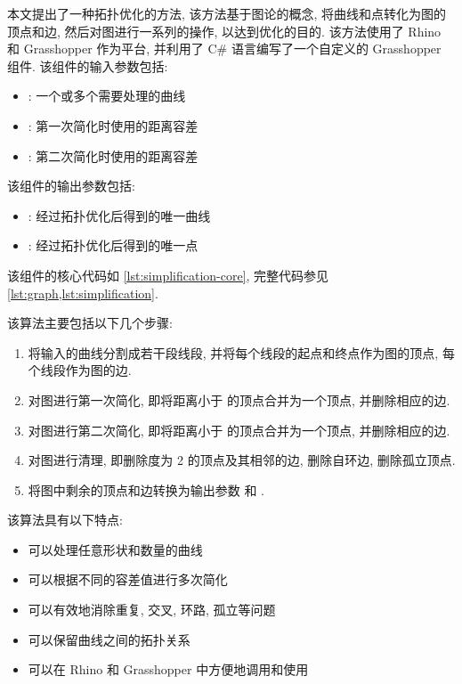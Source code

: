 本文提出了一种拓扑优化的方法, 该方法基于图论的概念, 将曲线和点转化为图的顶点和边, 然后对图进行一系列的操作, 以达到优化的目的. 该方法使用了 Rhino 和 Grasshopper 作为平台, 并利用了 C\# 语言编写了一个自定义的 Grasshopper 组件. 该组件的输入参数包括:
\begin{itemize}
  \item {}: 一个或多个需要处理的曲线
  \item {}: 第一次简化时使用的距离容差
  \item {}: 第二次简化时使用的距离容差
\end{itemize}
该组件的输出参数包括:
\begin{itemize}
  \item {}: 经过拓扑优化后得到的唯一曲线
  \item {}: 经过拓扑优化后得到的唯一点
\end{itemize}

该组件的核心代码如 \cref{lst:simplification-core}, 完整代码参见 \cref{lst:graph,lst:simplification}.


该算法主要包括以下几个步骤:
\begin{enumerate}
  \item 将输入的曲线分割成若干段线段, 并将每个线段的起点和终点作为图的顶点, 每个线段作为图的边.
  \item 对图进行第一次简化, 即将距离小于  的顶点合并为一个顶点, 并删除相应的边.
  \item 对图进行第二次简化, 即将距离小于  的顶点合并为一个顶点, 并删除相应的边.
  \item 对图进行清理, 即删除度为 2 的顶点及其相邻的边, 删除自环边, 删除孤立顶点.
  \item 将图中剩余的顶点和边转换为输出参数  和 .
\end{enumerate}

该算法具有以下特点:
\begin{itemize}
  \item 可以处理任意形状和数量的曲线
  \item 可以根据不同的容差值进行多次简化
  \item 可以有效地消除重复, 交叉, 环路, 孤立等问题
  \item 可以保留曲线之间的拓扑关系
  \item 可以在 Rhino 和 Grasshopper 中方便地调用和使用
\end{itemize}

